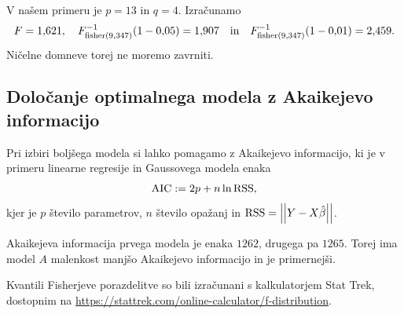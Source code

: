 \documentclass[12pt, a4paper]{article}
\begin{document}
V našem primeru je $p = 13$ in $q = 4$. Izračunamo 
\[
    F = 1{,}621, \quad
    F^{-1}_{\operatorname{fisher}(9,347)}(1-0{,}05) = 1{,}907 \quad \text{in} \quad
    F^{-1}_{\operatorname{fisher}(9,347)}(1-0{,}01) = 2{,}459.
\]
Ničelne domneve torej ne moremo zavrniti.

\subsection*{Določanje optimalnega modela z Akaikejevo informacijo}

Pri izbiri boljšega modela si lahko pomagamo z Akaikejevo informacijo, 
ki je v primeru linearne regresije in Gaussovega modela enaka
\[
    \operatorname{AIC} := 2p + n \ln \operatorname{RSS},
\]
kjer je $p$ število parametrov, $n$ število opažanj in $\operatorname{RSS} = \left\lvert\left\lvert Y - X\hat \beta\right\rvert\right\rvert$.

Akaikejeva informacija prvega modela je enaka $1262$,
drugega pa $1265$. Torej ima model $A$ malenkost
manjšo Akaikejevo informacijo in je primernejši.

\newpage

\nocite{*}
\printbibliography
{}

Kvantili Fisherjeve porazdelitve so bili izračunani s kalkulatorjem Stat Trek,
dostopnim na \url{https://stattrek.com/online-calculator/f-distribution}.
\end{document}
